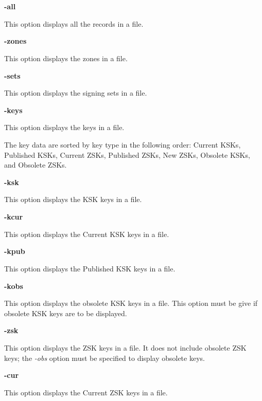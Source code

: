 \begin{description}

\item {\bf -all}\verb" "

This option displays all the records in a  file.

\item {\bf -zones}\verb" "

This option displays the zones in a  file.

\item {\bf -sets}\verb" "

This option displays the signing sets in a  file.

\item {\bf -keys}\verb" "

This option displays the keys in a  file.

The key data are sorted by key type in the following order:  Current KSKs,
Published KSKs, Current ZSKs, Published ZSKs, New ZSKs, Obsolete KSKs, and
Obsolete ZSKs.

\item {\bf -ksk}\verb" "

This option displays the KSK keys in a  file.

\item {\bf -kcur}\verb" "

This option displays the Current KSK keys in a  file.

\item {\bf -kpub}\verb" "

This option displays the Published KSK keys in a  file.

\item {\bf -kobs}\verb" "

This option displays the obsolete KSK keys in a  file.  This
option must be give if obsolete KSK keys are to be displayed.

\item {\bf -zsk}\verb" "

This option displays the ZSK keys in a  file.  It does not
include obsolete ZSK keys; the {\it -obs} option must be specified to display
obsolete keys.

\item {\bf -cur}\verb" "

This option displays the Current ZSK keys in a  file.


\end{description}
